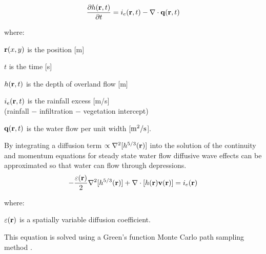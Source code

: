 \documentclass{isprs}
\begin{document}
\begin{equation}
\label{eq:water}
{\partial h({\bf r},t) \over \partial t} =
 i_e({\bf r},t) - \nabla \cdot {\bf q}({\bf r},t)
\end{equation}

where:

\hspace*{1em} ${\bf r}(x,y)$ is the position [m]

\hspace*{1em} $t$ is the time [s]

\hspace*{1em} $h({\bf r},t)$ is the depth of overland flow [m]

\hspace*{1em} $i_e({\bf r},t)$ is the rainfall excess [m/s]\\
\hspace*{1em} (rainfall $-$ infiltration $-$ vegetation intercept) 

\hspace*{1em} ${\bf q}({\bf r},t)$ is the water flow per unit width [$\rm m^2/s$].

By integrating a diffusion term $ \propto \nabla^2 [h^{5/3}({\bf r})]$ 
into
the solution of the continuity and momentum equations for steady state water flow
diffusive wave effects can be approximated
so that water can flow through depressions. 
%
\begin{equation}
\label{eq:difwater}
-{\varepsilon({\bf r})\over 2 }\nabla^2 [h^{5/3}({\bf r})]
+\nabla \cdot [ h({\bf r}){\bf v}({\bf r})] = i_e({\bf r})
\end{equation}

 where:
 
 \hspace*{1em} $\varepsilon({\bf r})$ is a spatially variable diffusion coefficient.

This equation is solved using a Green's function Monte Carlo path sampling method \cite{Mitasova2004}.
\end{document}
